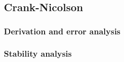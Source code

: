 \documentclass[12pt,english,a4paper]{article}
\begin{document}
%
\subsection{Crank-Nicolson}

\subsubsection{Derivation and error analysis}

\subsubsection{Stability analysis}




\clearpage
{}
\printbibliography
\end{document}
